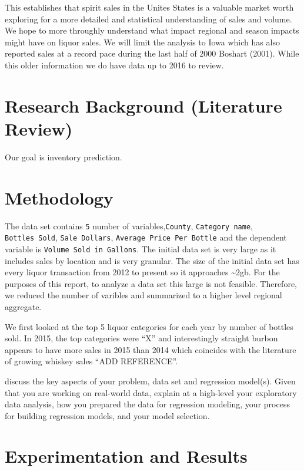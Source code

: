 \documentclass[]{elsarticle} %
\begin{document}
This establishes that spirit sales in the Unites States is a valuable
market worth exploring for a more detailed and statistical understanding
of sales and volume. We hope to more throughly understand what impact
regional and season impacts might have on liquor sales. We will limit
the analysis to Iowa which has also reported sales at a record pace
during the last half of 2000 Boshart (2001). While this older
information we do have data up to 2016 to review.

\section{Research Background (Literature
Review)}\label{research-background-literature-review}

Our goal is inventory prediction.

\section{Methodology}\label{methodology}

The data set contains \texttt{5} number of variables,\texttt{County},
\texttt{Category\ name}, \texttt{Bottles\ Sold}, \texttt{Sale\ Dollars},
\texttt{Average\ Price\ Per\ Bottle} and the dependent variable is
\texttt{Volume\ Sold\ in\ Gallons}. The initial data set is very large
as it includes sales by location and is very granular. The size of the
initial data set has every liquor transaction from 2012 to present so it
approaches \textasciitilde{}2gb. For the purposes of this report, to
analyze a data set this large is not feasible. Therefore, we reduced the
number of varibles and summarized to a higher level regional aggregate.

We first looked at the top 5 liquor categories for each year by number
of bottles sold. In 2015, the top categories were ``X'' and
interestingly straight burbon appears to have more sales in 2015 than
2014 which coincides with the literature of growing whiskey sales ``ADD
REFERENCE''.

discuss the key aspects of your problem, data set and regression
model(s). Given that you are working on real-world data, explain at a
high-level your exploratory data analysis, how you prepared the data for
regression modeling, your process for building regression models, and
your model selection.

\section{Experimentation and Results}\label{experimentation-and-results}
\end{document}

